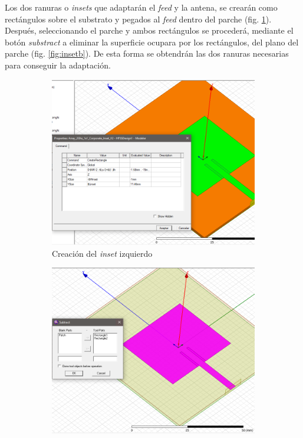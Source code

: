 \par Los dos ranuras o \textit{insets} que adaptarán el \textit{feed} y la antena, se crearán como rectángulos sobre el substrato y pegados al \textit{feed} dentro del parche (fig. \ref{fig:inseta}). Después, seleccionando el parche y ambos rectángulos se procederá, mediante el botón \textit{substract} a eliminar la superficie ocupara por los rectángulos, del plano del parche (fig. \ref{fig:insetb}). De esta forma se obtendrán las dos ranuras necesarias para conseguir la adaptación.
\\
\begin{figure}[p]
     \centering
     \begin{subfigure}[b]{0.45\textwidth}
         \centering
         \includegraphics[width=\textwidth]{archivos/desarrollo/7a}
         \caption{Creación del \textit{inset} izquierdo}
         \label{fig:inseta}
     \end{subfigure}
     \hfill
     \begin{subfigure}[b]{0.45\textwidth}
         \centering
         \includegraphics[width=\textwidth]{archivos/desarrollo/7b}

\end{subfigure}
\end{figure}
